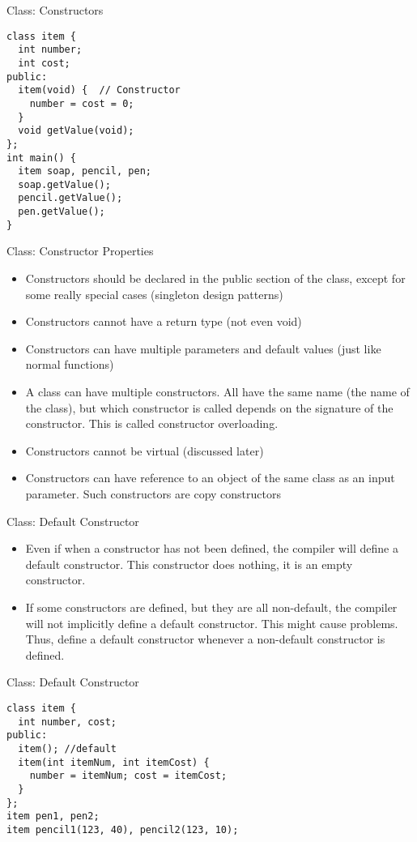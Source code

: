 \documentclass{beamer}
\begin{document}
\begin{frame}[fragile]{Class: Constructors}
  \begin{lstlisting}
class item {
  int number;
  int cost;
public:
  item(void) {  // Constructor
    number = cost = 0;
  }
  void getValue(void);
};
int main() {
  item soap, pencil, pen;
  soap.getValue();
  pencil.getValue();
  pen.getValue();
}
  \end{lstlisting}
\end{frame}

\begin{frame}[fragile]{Class: Constructor Properties}
  \begin{itemize}
  \item Constructors should be declared in the public section of the class, except for some really special cases (singleton design patterns)\pause
  \item Constructors cannot have a return type (not even void)\pause
  \item Constructors can have multiple parameters and default values (just like normal functions)\pause
  \item A class can have multiple constructors. All have the same name (the name of the class), but which constructor is called depends on the signature of the constructor. This is called constructor overloading.\pause
  \item Constructors cannot be virtual (discussed later)\pause
  \item Constructors can have reference to an object of the same class as an input parameter. Such constructors are copy constructors
  \end{itemize}
\end{frame}

\begin{frame}[fragile]{Class: Default Constructor}
  \begin{itemize}
  \item Even if when a constructor has not been defined, the compiler will define a default constructor. This constructor does nothing, it is an empty constructor.\pause
  \item If some constructors are defined, but they are all non-default, the compiler will not implicitly define a default constructor. This might cause problems. Thus, define a default constructor whenever a non-default constructor is defined.
  \end{itemize}
\end{frame}

\begin{frame}[fragile]{Class: Default Constructor}
  \begin{lstlisting}
class item {
  int number, cost;
public:
  item(); //default
  item(int itemNum, int itemCost) {
    number = itemNum; cost = itemCost;
  }
};
item pen1, pen2;
item pencil1(123, 40), pencil2(123, 10);
  \end{lstlisting}
\end{frame}
\end{document}

